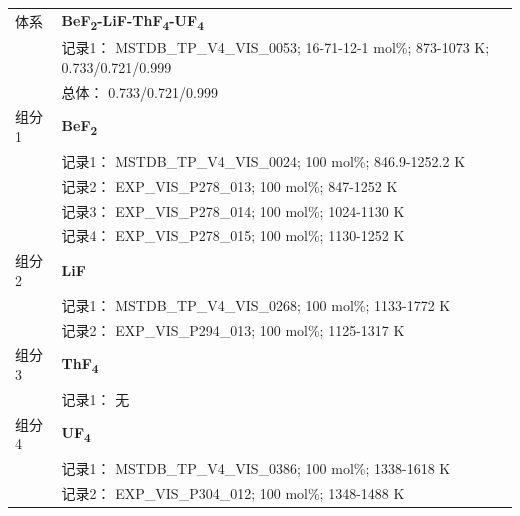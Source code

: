 \documentclass[12pt]{article}
\begin{document}
{\begin{longtable}[]{@{}
  >{\raggedright\arraybackslash}p{}
  >{\raggedright\arraybackslash}p{}@{}}
\midrule
体系 & \textbf{BeF\textsubscript{2}-LiF-ThF\textsubscript{4}-UF\textsubscript{4}} \\
 & 记录1： MSTDB\_TP\_V4\_VIS\_0053; 16-71-12-1 mol\%; 873-1073 K; 0.733/0.721/0.999 \\
 & 总体： 0.733/0.721/0.999  \\

组分 1  & \textbf{BeF\textsubscript{2}} \\
 & 记录1： MSTDB\_TP\_V4\_VIS\_0024; 100 mol\%; 846.9-1252.2 K \\
 & 记录2： EXP\_VIS\_P278\_013; 100 mol\%; 847-1252 K \\
 & 记录3： EXP\_VIS\_P278\_014; 100 mol\%; 1024-1130 K \\
 & 记录4： EXP\_VIS\_P278\_015; 100 mol\%; 1130-1252 K  \\

组分 2  & \textbf{LiF} \\
 & 记录1： MSTDB\_TP\_V4\_VIS\_0268; 100 mol\%; 1133-1772 K \\
 & 记录2： EXP\_VIS\_P294\_013; 100 mol\%; 1125-1317 K  \\

组分 3 & \textbf{ThF\textsubscript{4}} \\
 & 记录1： 无 \\
组分 4  & \textbf{UF\textsubscript{4}} \\
 & 记录1： MSTDB\_TP\_V4\_VIS\_0386; 100 mol\%; 1338-1618 K \\
 & 记录2： EXP\_VIS\_P304\_012; 100 mol\%; 1348-1488 K  \\


\end{longtable}}
\end{document}
